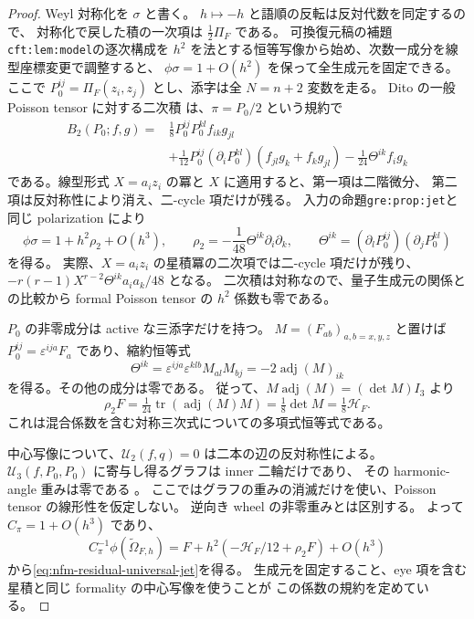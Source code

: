 \begin{proof}
Weyl 対称化を $\sigma$ と書く。
$h\mapsto-h$ と語順の反転は反対代数を同定するので、
対称化で戻した積の一次項は $\frac12\Pi_F$ である。
可換復元稿の補題\texttt{cft:lem:model}の逐次構成を
$h^2$ を法とする恒等写像から始め、次数一成分を線型座標変更で調整すると、
$\phi\sigma=1+O(h^2)$ を保って全生成元を固定できる。
ここで $P_0^{ij}=\Pi_F(z_i,z_j)$ とし、添字は全 $N=n+2$ 変数を走る。
Dito の一般 Poisson tensor に対する二次積
\cite[Section~2, equation~(3)]{NFMDito}は、$\pi=P_0/2$ という規約で
\[
 \begin{aligned}
 B_2(P_0;f,g)={}&\frac18P_0^{ij}P_0^{kl}f_{ik}g_{jl}\\
 &+\frac1{12}P_0^{ij}(\partial_iP_0^{kl})
                  (f_{jl}g_k+f_kg_{jl})
   -\frac1{24}\Theta^{ik}f_i g_k
 \end{aligned}
\]
である。線型形式 $X=a_i z_i$ の冪と $X$ に適用すると、第一項は二階微分、
第二項は反対称性により消え、二-cycle 項だけが残る。
入力の命題\texttt{gre:prop:jet}と同じ polarization により
\[
 \phi\sigma=1+h^2\rho_2+O(h^3),\qquad
 \rho_2=-\frac1{48}\Theta^{ik}\partial_i\partial_k,
 \qquad
 \Theta^{ik}=(\partial_lP_0^{ij})(\partial_jP_0^{kl})
\]
を得る。
実際、$X=a_i z_i$ の星積冪の二次項では二-cycle 項だけが残り、
$-r(r-1)X^{r-2}\Theta^{ik}a_i a_k/48$ となる。
二次積は対称なので、量子生成元の関係との比較から
formal Poisson tensor の $h^2$ 係数も零である。

$P_0$ の非零成分は active な三添字だけを持つ。
$M=(F_{ab})_{a,b=x,y,z}$ と置けば
$P_0^{ij}=\varepsilon^{ija}F_a$ であり、縮約恒等式
\[
 \Theta^{ik}
 =\varepsilon^{ija}\varepsilon^{klb}M_{al}M_{bj}
 =-2\operatorname{adj}(M)_{ik}
\]
を得る。その他の成分は零である。
従って、$M\operatorname{adj}(M)=(\det M)I_3$ より
\[
 \rho_2F=\tfrac1{24}\operatorname{tr}(\operatorname{adj}(M)M)
        =\tfrac18\det M=\tfrac18\mathscr H_F.
\]
これは混合係数を含む対称三次式についての多項式恒等式である。

中心写像について、$\mathcal U_2(f,q)=0$ は二本の辺の反対称性による。
$\mathcal U_3(f,P_0,P_0)$ に寄与し得るグラフは inner 二輪だけであり、
その harmonic-angle 重みは零である
\cite[Section~1.3, Theorem]{NFMShoikhet}。
ここではグラフの重みの消滅だけを使い、Poisson tensor の線形性を仮定しない。
逆向き wheel の非零重みとは区別する\cite[Section~2.3.1]{NFMShoikhet}。
よって $C_\pi=1+O(h^3)$ であり、
\[
 C_\pi^{-1}\phi(\widetilde\Omega_{F,h})
  =F+h^2(-\mathscr H_F/12+\rho_2F)+O(h^3)
\]
から\eqref{eq:nfm-residual-universal-jet}を得る。
生成元を固定すること、eye 項を含む星積と同じ formality の中心写像を使うことが
この係数の規約を定めている。


\end{proof}
